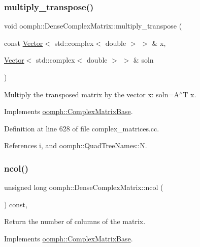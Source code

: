 \subsubsection{\texorpdfstring{multiply\+\_\+transpose()}{multiply\_transpose()}}
{\footnotesize\ttfamily void oomph\+::\+Dense\+Complex\+Matrix\+::multiply\+\_\+transpose (\begin{DoxyParamCaption}\item[{const \hyperlink{classoomph_1_1Vector}{Vector}$<$ std\+::complex$<$ double $>$ $>$ \&}]{x,  }\item[{\hyperlink{classoomph_1_1Vector}{Vector}$<$ std\+::complex$<$ double $>$ $>$ \&}]{soln }\end{DoxyParamCaption})\hspace{0.3cm}{\ttfamily [virtual]}}



Multiply the transposed matrix by the vector x\+: soln=A$^\wedge$T x. 



Implements \hyperlink{classoomph_1_1ComplexMatrixBase_a90c7832bad84aad3d0f437925efb089a}{oomph\+::\+Complex\+Matrix\+Base}.



Definition at line 628 of file complex\+\_\+matrices.\+cc.



References i, and oomph\+::\+Quad\+Tree\+Names\+::N.

\mbox{\label{classoomph_1_1DenseComplexMatrix_a4101f581e470c940bf7daf12ec1b234f}} 
\subsubsection{\texorpdfstring{ncol()}{ncol()}}
{\footnotesize\ttfamily unsigned long oomph\+::\+Dense\+Complex\+Matrix\+::ncol (\begin{DoxyParamCaption}{ }\end{DoxyParamCaption}) const\hspace{0.3cm}{\ttfamily [inline]}, {\ttfamily [virtual]}}



Return the number of columns of the matrix. 



Implements \hyperlink{classoomph_1_1ComplexMatrixBase_a849b63e50dad36ca8b20b7bdefd34b8d}{oomph\+::\+Complex\+Matrix\+Base}.




